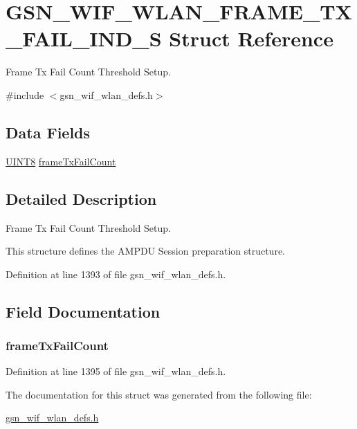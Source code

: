 \hypertarget{a00382}{
\section{GSN\_\-WIF\_\-WLAN\_\-FRAME\_\-TX\_\-FAIL\_\-IND\_\-S Struct Reference}
\label{a00382}
}


Frame Tx Fail Count Threshold Setup.  




{\ttfamily \#include $<$gsn\_\-wif\_\-wlan\_\-defs.h$>$}

\subsection*{Data Fields}
\begin{DoxyCompactItemize}
\item 
\hyperlink{a00660_gab27e9918b538ce9d8ca692479b375b6a}{UINT8} \hyperlink{a00382_a3d86740b562a13b8d7637a137addf16b}{frameTxFailCount}
\end{DoxyCompactItemize}


\subsection{Detailed Description}
Frame Tx Fail Count Threshold Setup. 

This structure defines the AMPDU Session preparation structure. 

Definition at line 1393 of file gsn\_\-wif\_\-wlan\_\-defs.h.



\subsection{Field Documentation}
\hypertarget{a00382_a3d86740b562a13b8d7637a137addf16b}{
\subsubsection[{frameTxFailCount}]{ {\bf frameTxFailCount}}}
\label{a00382_a3d86740b562a13b8d7637a137addf16b}


Definition at line 1395 of file gsn\_\-wif\_\-wlan\_\-defs.h.



The documentation for this struct was generated from the following file:\begin{DoxyCompactItemize}
\item 
\hyperlink{a00613}{gsn\_\-wif\_\-wlan\_\-defs.h}\end{DoxyCompactItemize}
